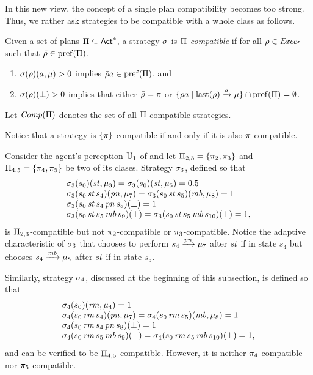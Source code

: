 In this new view, the concept of a single plan compatibility becomes
too strong.  Thus, we rather ask strategies to be compatible with a
whole class as follows.

\begin{definition}\label{def:plans:compat}
  Given a set of plans $\Pi\subseteq{\rm \sf Act}^*$, a strategy $\sigma$ is
  \emph{$\Pi$-compatible} if for all $\rho\in\mathit{Exec}_{\mathsf{f}}$ such that
  $\bar{\rho}\in\mathrm{pref}(\Pi)$,
  \begin{enumerate}
  \item\label{def:plans:compat:i}%
    $\sigma(\rho)(a,\mu)>0$ implies $\bar{\rho}a\in\mathrm{pref}(\Pi)$, and
  \item\label{def:plans:compat:ii}%
    $\sigma(\rho)(\bot)>0$ implies that either
    $\bar{\rho}=\pi$ or
    $\{\bar{\rho}a\mid{\mathrm{last}(\rho)\xrightarrow{a}\mu}\}\cap\mathrm{pref}(\Pi) = \emptyset$. 
  \end{enumerate}
  Let $\mathit{Comp}(\Pi)$ denotes the set of all $\Pi$-compatible
  strategies.
\end{definition}
%
Notice that a strategy is $\{\pi\}$-compatible if and only if it is
also $\pi$-compatible.

\begin{example}\label{ex:running:strat-comp-adapt}
  Consider the agent's perception $\operatorname{U}_1$ of
   and let $\Pi_{2,3}=\{\pi_2,\pi_3\}$
  and $\Pi_{4,5}=\{\pi_4,\pi_5\}$ be two of its clases.
  Strategy $\sigma_3$, defined so that
  \[
  \begin{array}{l}
    \sigma_3(s_0)(\mathit{st},\mu_3)=\sigma_3(s_0)(\mathit{st},\mu_5)=0.5\\
    \sigma_3(s_0\,\mathit{st}\,s_4)(\mathit{pn},\mu_7)=\sigma_3(s_0\,\mathit{st}\,s_5)(\mathit{mb},\mu_8)=1\\
    \sigma_3(s_0\,\mathit{st}\,s_4\,\mathit{pn}\,s_8)(\bot)=1\\
    \sigma_3(s_0\,\mathit{st}\,s_5\,\mathit{mb}\,s_9)(\bot)=
    \sigma_3(s_0\,\mathit{st}\,s_5\,\mathit{mb}\,s_{10})(\bot)=1,
  \end{array}
  \]
  is $\Pi_{2,3}$-compatible but not
  $\pi_2$-compatible or $\pi_3$-compatible.
  Notice the adaptive characteristic of $\sigma_3$ that chooses to
  perform $s_4\xrightarrow{\mathit{pn}}\mu_7$ after $\mathit{st}$ if in state $s_4$
  but chooses $s_4\xrightarrow{\mathit{mb}}\mu_8$ after $\mathit{st}$ if in
  state $s_5$.

  Similarly, strategy $\sigma_4$, discussed at the beginning of this
  subsection, is defined so that
  \[
  \begin{array}{l}
    \sigma_4(s_0)(\mathit{rm},\mu_4)=1\\
    \sigma_4(s_0\,\mathit{rm}\,s_4)(\mathit{pn},\mu_7)=\sigma_4(s_0\,\mathit{rm}\,s_5)(\mathit{mb},\mu_8)=1\\
    \sigma_4(s_0\,\mathit{rm}\,s_4\,\mathit{pn}\,s_8)(\bot)=1\\
    \sigma_4(s_0\,\mathit{rm}\,s_5\,\mathit{mb}\,s_9)(\bot)=
    \sigma_4(s_0\,\mathit{rm}\,s_5\,\mathit{mb}\,s_{10})(\bot)=1,
  \end{array}
  \]
  and can be verified to be $\Pi_{4,5}$-compatible. However, it is
  neither $\pi_4$-compatible nor $\pi_5$-compatible.
\end{example}

